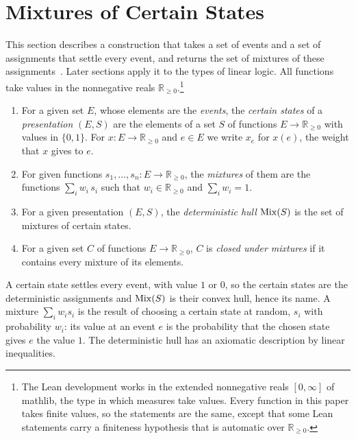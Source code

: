 \section{Mixtures of Certain States}
\label{sec:calculi}

This section describes a construction that takes a set of events and a
set of assignments that settle every event, and returns the set of
mixtures of these
assignments~\cite{definetti1974,paris2001,williams2012}. Later sections
apply it to the types of linear logic.
All functions take values in the
nonnegative reals $\mathbb{R}_{\ge 0}$.\footnote{The Lean development
works in the extended nonnegative reals $[0,\infty]$ of \textsf{mathlib},
the type in which measures take values. Every function in this paper takes
finite values, so the statements are the same, except that some Lean
statements carry a finiteness hypothesis that is automatic over
$\mathbb{R}_{\ge 0}$.}

\begin{definition}
\label{def:mix}
\begin{enumerate}
  \item[(i)] For a given set $E$, whose elements are the \emph{events},
  the \emph{certain states} of a \emph{presentation} $(E, S)$ are the
  elements of a set $S$ of functions $E \to \mathbb{R}_{\ge 0}$ with
  values in $\{0,1\}$. For $x : E \to \mathbb{R}_{\ge 0}$ and $e \in E$
  we write $x_e$ for $x(e)$, the weight that $x$ gives to $e$.
  \item[(ii)] For given functions $s_1, \dots, s_n : E \to \mathbb{R}_{\ge 0}$,
  the \emph{mixtures} of them are the functions $\sum_i w_i\, s_i$ such
  that $w_i \in \mathbb{R}_{\ge 0}$ and $\sum_i w_i = 1$.
  \item[(iii)] For a given presentation $(E, S)$, the \emph{deterministic hull}
  $\mathrm{Mix}(S)$ is the set of mixtures of certain states.
  \item[(iv)] For a given set $C$ of functions $E \to \mathbb{R}_{\ge 0}$,
  $C$ is \emph{closed under mixtures} if it contains every mixture of its
  elements.
\end{enumerate}
\end{definition}

\noindent
A certain state settles every event, with value $1$ or $0$, so the
certain states are the deterministic assignments and $\mathrm{Mix}(S)$ is their
convex hull, hence its name. A mixture
$\sum_i w_i s_i$ is the result of choosing a certain state at random,
$s_i$ with probability $w_i$: its value at an event $e$ is the
probability that the chosen state gives $e$ the value $1$. The deterministic hull
has an axiomatic description by linear inequalities.

